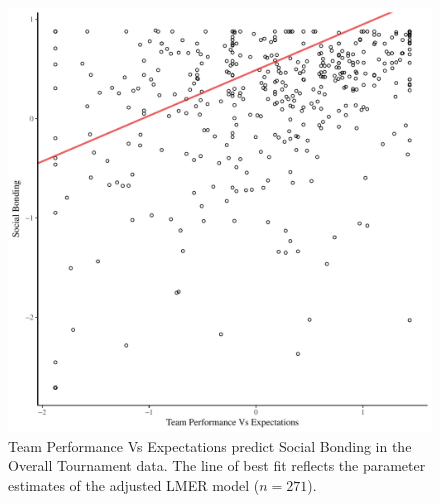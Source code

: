 \begin{CJK}{UTF8}{gbsn}
   \begin{figure}[htbp]
     \centering
   \includegraphics[scale=.5]{images/teamPerfBondOverallModelSlope.pdf}
     \caption{Team Performance Vs Expectations predict Social Bonding in the Overall Tournament data. The line of best fit reflects the parameter estimates of the adjusted LMER model ($n = 271$).}
     \label{fig:teamPerfBondOverallModelSlope}
   \end{figure}




















\clearpage


\end{CJK}
